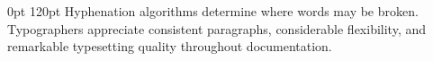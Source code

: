 \documentclass{article}
\begin{document}
 0pt 120pt Hyphenation algorithms determine where words may be broken. Typographers appreciate consistent paragraphs, considerable flexibility, and remarkable typesetting quality throughout documentation.
\end{document}

